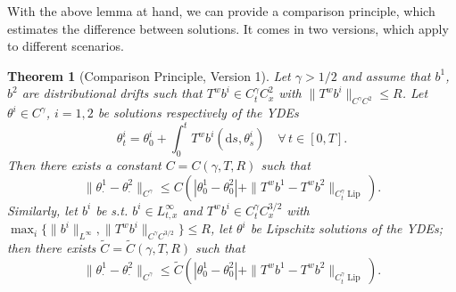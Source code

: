 \documentclass[10pt]{article}
\newcommand{\mathd}{\mathrm{d}}
\newcommand{\tmop}[1]{\ensuremath{\operatorname{#1}}}
\newtheorem{theorem}{Theorem}
\begin{document}
With the above lemma at hand, we can provide a comparison principle, which
estimates the difference between solutions. It comes in two versions, which
apply to different scenarios.

\begin{theorem}[Comparison Principle, Version 1]
  \label{sec4.1 comparison thm v1}Let $\gamma > 1 / 2$ and assume that $b^1$,
  $b^2$ are distributional drifts such that $T^w b^i \in C^{\gamma}_t C^2_x$
  with $\| T^w b^i \|_{C^{\gamma} C^2} \leqslant R$. Let $\theta^i \in
  C^{\gamma}$, $i = 1, 2$ be solutions respectively of the YDEs
  \[ \theta_t^i = \theta_0^i + \int_0^t T^w b^i (\mathd s, \theta^i_s)  \quad
     \forall \, t \in [0, T] . \]
  Then there exists a constant $C = C (\gamma, T, R)$ such that
  \begin{equation}
    \| \theta^1_{\cdot} - \theta^2_{\cdot} \|_{C^{\gamma}} \leqslant C (|
    \theta^1_0 - \theta^2_0 | + \| T^w b^1 - T^w b^2 \|_{C^{\gamma}_t
    \tmop{Lip}}) . \label{sec4.1 comparison v1.1}
  \end{equation}
  Similarly, let $b^i$ be s.t. $b^i \in L^{\infty}_{t, x}$ and $T^w b^i
  \in C^{\gamma}_t C^{3 / 2}_x$ with $\max_i \{ \| b^i \|_{L^{\infty}}, \| T^w
  b^i \|_{C^{\gamma} C^{3 / 2}} \} \leqslant R$, let $\theta^i$ be Lipschitz
  solutions of the YDEs; then there exists $\tilde{C} = \tilde{C} (\gamma, T,
  R)$ such that
  \begin{equation}
    \| \theta^1_{\cdot} - \theta^2_{\cdot} \|_{C^{\gamma}} \leqslant \tilde{C}
    (| \theta^1_0 - \theta^2_0 | + \| T^w b^1 - T^w b^2 \|_{C^{\gamma}_t
    \tmop{Lip}}) . \label{sec4.1 comparison v1.2}
  \end{equation}
\end{theorem}
\end{document}
